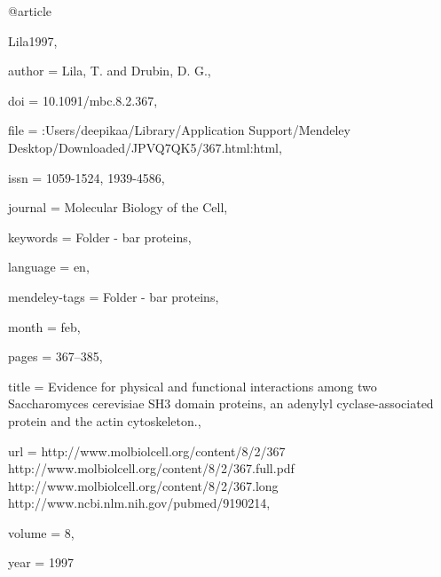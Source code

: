 @article{Lila1997,

author = {Lila, T. and Drubin, D. G.},

doi = {10.1091/mbc.8.2.367},

file = {:Users/deepikaa/Library/Application Support/Mendeley Desktop/Downloaded/JPVQ7QK5/367.html:html},

issn = {1059-1524, 1939-4586},

journal = {Molecular Biology of the Cell},

keywords = {Folder - bar proteins},

language = {en},

mendeley-tags = {Folder - bar proteins},

month = {feb},

pages = {367--385},

title = {{Evidence for physical and functional interactions among two Saccharomyces cerevisiae SH3 domain proteins, an adenylyl cyclase-associated protein and the actin cytoskeleton.}},

url = {http://www.molbiolcell.org/content/8/2/367 http://www.molbiolcell.org/content/8/2/367.full.pdf http://www.molbiolcell.org/content/8/2/367.long http://www.ncbi.nlm.nih.gov/pubmed/9190214},

volume = {8},

year = {1997}

}

